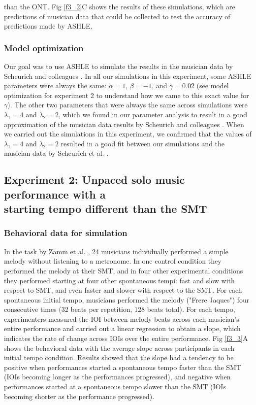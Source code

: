 \documentclass{report}
\begin{document}
than the ONT. Fig \ref{f3_2}C shows the results of these simulations, which are predictions of musician data that could be collected to test the accuracy of predictions made by ASHLE.

\subsubsection{Model optimization} 

Our goal was to use ASHLE to simulate the results in the musician data by Scheurich and colleagues \cite{scheurich2018tapping}. In all our simulations in this experiment, some ASHLE parameters were always the same: $\alpha=1$, $\beta=-1$, and $\gamma=0.02$ (see model optimization for experiment 2 to understand how we came to this exact value for $\gamma$). The other two parameters that were always the same across simulations were $\lambda_1=4$ and $\lambda_2=2$, which we found in our parameter analysis to result in a good approximation of the musician data results by Scheurich and colleagues \cite{scheurich2018tapping}. When we carried out the simulations in this experiment, we confirmed that the values of $\lambda_1=4$ and $\lambda_2=2$ resulted in a good fit between our simulations and the musician data by Scheurich et al. \cite{scheurich2018tapping}.

\subsection{Experiment 2: Unpaced solo music performance with a \\ starting tempo different than the SMT}

\subsubsection{Behavioral data for simulation}

In the task by Zamm et al. \cite{zamm2018musicians}, 24 musicians individually performed a simple melody without listening to a metronome. In one control condition they performed the melody at their SMT, and in four other experimental conditions they performed starting at four other spontaneous tempi: fast and slow with respect to SMT, and even faster and slower with respect to the SMT. For each spontaneous initial tempo, musicians performed the melody ("Frere Jaques") four consecutive times (32 beats per repetition, 128 beats total). For each tempo, experimenters measured the IOI between melody beats across each musician's entire performance and carried out a linear regression to obtain a slope, which indicates the rate of change across IOIs over the entire performance. Fig \ref{f3_3}A shows the behavioral data with the average slope across participants in each initial tempo condition. Results showed that the slope had a tendency to be positive when performances started a spontaneous tempo faster than the SMT (IOIs becoming longer as the performances progressed), and negative when performances started at a spontaneous tempo slower than the SMT (IOIs becoming shorter as the performance progressed).
\end{document}
